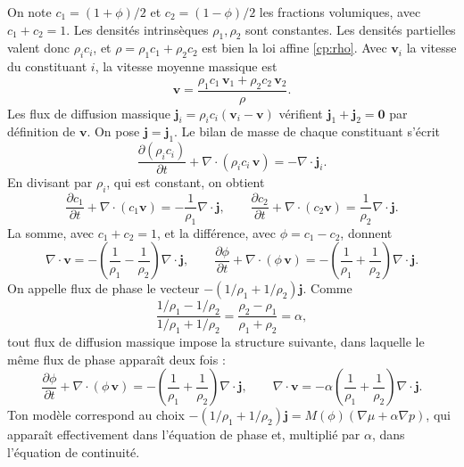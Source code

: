 On note $c_1 = (1+\phi)/2$ et $c_2 = (1-\phi)/2$ les fractions volumiques, avec $c_1+c_2=1$. Les densités intrinsèques $\rho_1,\rho_2$ sont constantes. Les densités partielles valent donc $\rho_i c_i$, et $\rho = \rho_1c_1+\rho_2c_2$ est bien la loi affine \eqref{cp:rho}. Avec $\mathbf{v}_i$ la vitesse du constituant $i$, la vitesse moyenne massique est
\begin{equation}
  \mathbf{v} = \frac{\rho_1c_1\,\mathbf{v}_1 + \rho_2c_2\,\mathbf{v}_2}{\rho} .
\end{equation}
Les flux de diffusion massique $\mathbf{j}_i = \rho_ic_i\left(\mathbf{v}_i-\mathbf{v}\right)$ vérifient $\mathbf{j}_1+\mathbf{j}_2=\mathbf{0}$ par définition de $\mathbf{v}$. On pose $\mathbf{j}=\mathbf{j}_1$. Le bilan de masse de chaque constituant s'écrit
\begin{equation}
  \frac{\partial(\rho_ic_i)}{\partial t} + \nabla\cdot\left(\rho_ic_i\,\mathbf{v}\right) = -\nabla\cdot\mathbf{j}_i .
\end{equation}
En divisant par $\rho_i$, qui est constant, on obtient
\begin{equation}
  \frac{\partial c_1}{\partial t} + \nabla\cdot\left(c_1\mathbf{v}\right) = -\frac{1}{\rho_1}\nabla\cdot\mathbf{j},
  \qquad
  \frac{\partial c_2}{\partial t} + \nabla\cdot\left(c_2\mathbf{v}\right) = \frac{1}{\rho_2}\nabla\cdot\mathbf{j}.
\end{equation}
La somme, avec $c_1+c_2=1$, et la différence, avec $\phi=c_1-c_2$, donnent
\begin{equation}
  \nabla\cdot\mathbf{v} = -\left(\frac{1}{\rho_1}-\frac{1}{\rho_2}\right)\nabla\cdot\mathbf{j},
  \qquad
  \frac{\partial\phi}{\partial t} + \nabla\cdot\left(\phi\,\mathbf{v}\right)
  = -\left(\frac{1}{\rho_1}+\frac{1}{\rho_2}\right)\nabla\cdot\mathbf{j}.
\end{equation}
On appelle flux de phase le vecteur $-\left(1/\rho_1+1/\rho_2\right)\mathbf{j}$. Comme
\begin{equation}
  \frac{1/\rho_1-1/\rho_2}{1/\rho_1+1/\rho_2} = \frac{\rho_2-\rho_1}{\rho_1+\rho_2} = \alpha,
\end{equation}
tout flux de diffusion massique impose la structure suivante, dans laquelle le même flux de phase apparaît deux fois :
\begin{equation}\label{cp:structure}
  \frac{\partial\phi}{\partial t} + \nabla\cdot\left(\phi\,\mathbf{v}\right)
  = -\left(\frac{1}{\rho_1}+\frac{1}{\rho_2}\right)\nabla\cdot\mathbf{j},
  \qquad
  \nabla\cdot\mathbf{v}
  = -\alpha\left(\frac{1}{\rho_1}+\frac{1}{\rho_2}\right)\nabla\cdot\mathbf{j}.
\end{equation}
Ton modèle correspond au choix $-\left(1/\rho_1+1/\rho_2\right)\mathbf{j} = M(\phi)\left(\nabla\mu+\alpha\nabla p\right)$, qui apparaît effectivement dans l'équation de phase et, multiplié par $\alpha$, dans l'équation de continuité.

